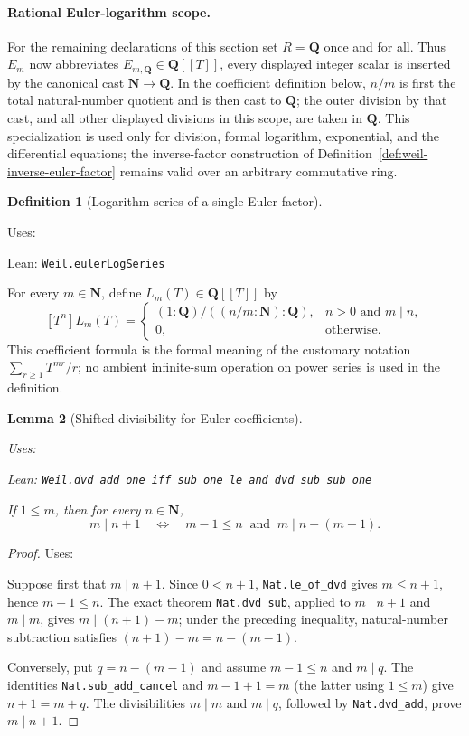 \documentclass[11pt]{report}
\newcommand{\lean}[1]{%
  \par\smallskip\noindent\textcolor{blue!55!black}{\textsf{Lean:} }%
  \footnotesize\sloppy\nolinkurl{#1}\par}
\newcommand{\uses}[1]{%
  \par\smallskip\noindent\textcolor{purple!60!black}{\textsf{Uses:} }%
  \footnotesize\sloppy\auditdependencylist{#1}\par}
\theoremstyle{definition}
\newtheorem{definition}{Definition}[section]
\theoremstyle{plain}
\newtheorem{lemma}[definition]{Lemma}
\theoremstyle{remark}
\begin{document}
\paragraph{Rational Euler-logarithm scope.}
For the remaining declarations of this section set $R=\mathbf Q$ once and
for all.  Thus $E_m$ now abbreviates $E_{m,\mathbf Q}\in\mathbf Q[[T]]$,
every displayed integer scalar is inserted by the canonical cast
$\mathbf N\to\mathbf Q$.  In the coefficient definition below, $n/m$ is
first the total natural-number quotient and is then cast to $\mathbf Q$;
the outer division by that cast, and all other displayed divisions in this
scope, are taken in $\mathbf Q$.
This specialization is used only for division, formal logarithm,
exponential, and the differential equations; the inverse-factor construction
of Definition~\ref{def:weil-inverse-euler-factor} remains valid over an
arbitrary commutative ring.

\begin{definition}[Logarithm series of a single Euler factor]
  \label{def:weil-euler-log-series}
  \uses{}
  \lean{Weil.eulerLogSeries}

  For every $m\in\mathbf N$, define $L_m(T)\in\mathbf Q[[T]]$ by
  \[
    [T^n]L_m(T)=
      \begin{cases}
        (1:\mathbf Q)/((n/m:\mathbf N):\mathbf Q),
          &n>0\text{ and }m\mid n,\\
        0,&\text{otherwise}.
      \end{cases}
  \]
  This coefficient formula is the formal meaning of the customary notation
  $\sum_{r\geq1}T^{mr}/r$; no ambient infinite-sum operation on power
  series is used in the definition.
\end{definition}

\begin{lemma}[Shifted divisibility for Euler coefficients]
  \label{lemma:weil-euler-log-shift-divisibility}
  \uses{}
  \lean{Weil.dvd_add_one_iff_sub_one_le_and_dvd_sub_sub_one}

  If $1\leq m$, then for every $n\in\mathbf N$,
  \[
    m\mid n+1
      \quad\Longleftrightarrow\quad
    m-1\leq n\ \text{ and }\ m\mid n-(m-1).
  \]
\end{lemma}

\begin{proof}
  \uses{}
  Suppose first that $m\mid n+1$.  Since $0<n+1$,
  \texttt{Nat.le\_of\_dvd} gives $m\leq n+1$, hence $m-1\leq n$.
  The exact theorem \texttt{Nat.dvd\_sub}, applied to $m\mid n+1$ and
  $m\mid m$, gives $m\mid(n+1)-m$; under the preceding inequality,
  natural-number subtraction satisfies
  $(n+1)-m=n-(m-1)$.

  Conversely, put $q=n-(m-1)$ and assume $m-1\leq n$ and $m\mid q$.
  The identities \texttt{Nat.sub\_add\_cancel} and
  $m-1+1=m$ (the latter using $1\leq m$) give
  $n+1=m+q$.  The divisibilities $m\mid m$ and $m\mid q$, followed by
  \texttt{Nat.dvd\_add}, prove $m\mid n+1$.
\end{proof}
\end{document}
